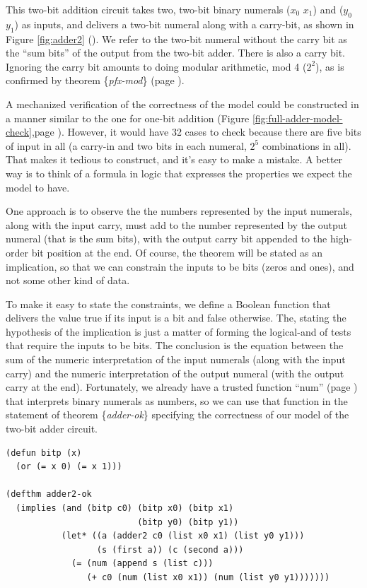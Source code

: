 This two-bit addition circuit takes two, two-bit binary numerals
($x_0$ $x_1$) and ($y_0$ $y_1$) as inputs, and
delivers a two-bit numeral along with a carry-bit,
as shown in Figure \ref{fig:adder2} (\pageref{fig:adder2}).
We refer to the two-bit numeral without the carry bit
as the ``sum bits'' of the output from the two-bit adder.
There is also a carry bit.
Ignoring the carry bit amounts to doing
modular arithmetic, mod 4 ($2^2$), as is
confirmed by theorem \{\emph{pfx-mod}\} (page \pageref{pfx-mod}).

A mechanized verification of the correctness of the model
could be constructed in a manner similar to the one for one-bit addition
(Figure \ref{fig:full-adder-model-check},page \pageref{fig:full-adder-model-check}).
However, it would have 32 cases to check
because there are five bits of input in all
(a carry-in and two bits in each numeral, $2^5$ combinations in all).
That makes it tedious to construct, and it's easy to make a mistake.
A better way is to think of a formula in logic that expresses
the properties we expect the model to have.

One approach is to observe
the the numbers represented by the input
numerals, along with the input carry, must
add to the number represented by the output numeral (that is the sum bits),
with the output carry bit appended to the high-order bit position at the end.
Of course, the theorem will be stated as an implication, so that
we can constrain the inputs to be bits (zeros and ones),
and not some other kind of data.

To make it easy to state the constraints,
we define a Boolean function that delivers the value true
if its input is a bit and false otherwise.
The, stating the hypothesis of the implication
is just a matter of forming the logical-and
of tests that require the inputs to be bits.
The conclusion is the equation between the
sum of the numeric interpretation of the input numerals
(along with the input carry)
and the numeric interpretation of the output numeral
(with the output carry at the end).
Fortunately, we already have a trusted function
``num'' (page \pageref{num-defun})
that interprets binary numerals as numbers,
so we can use that function in the statement of
theorem \{\emph{adder-ok}\} specifying
the correctness of our model of the two-bit adder circuit.

\label{bitp-defun}
\begin{lstlisting}
(defun bitp (x)
  (or (= x 0) (= x 1)))

(defthm adder2-ok
  (implies (and (bitp c0) (bitp x0) (bitp x1)
                          (bitp y0) (bitp y1))
           (let* ((a (adder2 c0 (list x0 x1) (list y0 y1)))
                  (s (first a)) (c (second a)))
             (= (num (append s (list c)))
                (+ c0 (num (list x0 x1)) (num (list y0 y1)))))))
\end{lstlisting}
\label{adder2-ok}

